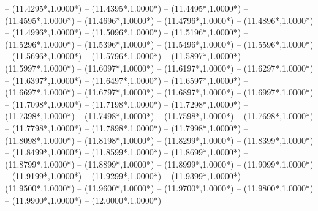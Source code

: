 {	-- ({11.4295*\dx},{1.0000*\dy})
	-- ({11.4395*\dx},{1.0000*\dy})
	-- ({11.4495*\dx},{1.0000*\dy})
	-- ({11.4595*\dx},{1.0000*\dy})
	-- ({11.4696*\dx},{1.0000*\dy})
	-- ({11.4796*\dx},{1.0000*\dy})
	-- ({11.4896*\dx},{1.0000*\dy})
	-- ({11.4996*\dx},{1.0000*\dy})
	-- ({11.5096*\dx},{1.0000*\dy})
	-- ({11.5196*\dx},{1.0000*\dy})
	-- ({11.5296*\dx},{1.0000*\dy})
	-- ({11.5396*\dx},{1.0000*\dy})
	-- ({11.5496*\dx},{1.0000*\dy})
	-- ({11.5596*\dx},{1.0000*\dy})
	-- ({11.5696*\dx},{1.0000*\dy})
	-- ({11.5796*\dx},{1.0000*\dy})
	-- ({11.5897*\dx},{1.0000*\dy})
	-- ({11.5997*\dx},{1.0000*\dy})
	-- ({11.6097*\dx},{1.0000*\dy})
	-- ({11.6197*\dx},{1.0000*\dy})
	-- ({11.6297*\dx},{1.0000*\dy})
	-- ({11.6397*\dx},{1.0000*\dy})
	-- ({11.6497*\dx},{1.0000*\dy})
	-- ({11.6597*\dx},{1.0000*\dy})
	-- ({11.6697*\dx},{1.0000*\dy})
	-- ({11.6797*\dx},{1.0000*\dy})
	-- ({11.6897*\dx},{1.0000*\dy})
	-- ({11.6997*\dx},{1.0000*\dy})
	-- ({11.7098*\dx},{1.0000*\dy})
	-- ({11.7198*\dx},{1.0000*\dy})
	-- ({11.7298*\dx},{1.0000*\dy})
	-- ({11.7398*\dx},{1.0000*\dy})
	-- ({11.7498*\dx},{1.0000*\dy})
	-- ({11.7598*\dx},{1.0000*\dy})
	-- ({11.7698*\dx},{1.0000*\dy})
	-- ({11.7798*\dx},{1.0000*\dy})
	-- ({11.7898*\dx},{1.0000*\dy})
	-- ({11.7998*\dx},{1.0000*\dy})
	-- ({11.8098*\dx},{1.0000*\dy})
	-- ({11.8198*\dx},{1.0000*\dy})
	-- ({11.8299*\dx},{1.0000*\dy})
	-- ({11.8399*\dx},{1.0000*\dy})
	-- ({11.8499*\dx},{1.0000*\dy})
	-- ({11.8599*\dx},{1.0000*\dy})
	-- ({11.8699*\dx},{1.0000*\dy})
	-- ({11.8799*\dx},{1.0000*\dy})
	-- ({11.8899*\dx},{1.0000*\dy})
	-- ({11.8999*\dx},{1.0000*\dy})
	-- ({11.9099*\dx},{1.0000*\dy})
	-- ({11.9199*\dx},{1.0000*\dy})
	-- ({11.9299*\dx},{1.0000*\dy})
	-- ({11.9399*\dx},{1.0000*\dy})
	-- ({11.9500*\dx},{1.0000*\dy})
	-- ({11.9600*\dx},{1.0000*\dy})
	-- ({11.9700*\dx},{1.0000*\dy})
	-- ({11.9800*\dx},{1.0000*\dy})
	-- ({11.9900*\dx},{1.0000*\dy})
	-- ({12.0000*\dx},{1.0000*\dy})
}
